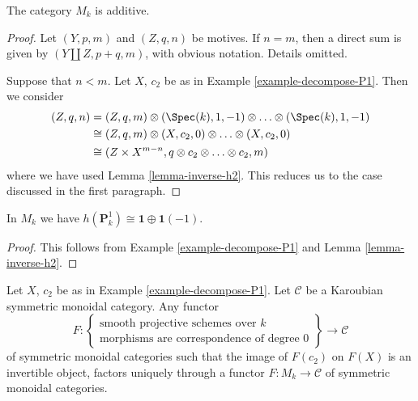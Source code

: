 \begin{lemma}
\label{lemma-additive}
The category $M_k$ is additive.
\end{lemma}

\begin{proof}
Let $(Y, p, m)$ and $(Z, q, n)$ be motives. If $n = m$, then a
direct sum is given by $(Y \amalg Z, p + q, m)$, with obvious notation.
Details omitted.

\medskip\noindent
Suppose that $n < m$. Let $X$, $c_2$ be as in
Example \ref{example-decompose-P1}. Then we consider
\begin{align*}
(Z, q, n)
& =
(Z, q, m) \otimes (\Spec(k), 1, -1) \otimes \ldots \otimes
(\Spec(k), 1, -1) \\
& \cong
(Z, q, m) \otimes (X, c_2, 0) \otimes \ldots \otimes (X, c_2, 0) \\
& \cong
(Z \times X^{m - n}, q \otimes c_2 \otimes \ldots \otimes c_2, m)
\end{align*}
where we have used Lemma \ref{lemma-inverse-h2}.
This reduces us to the case discussed in the first paragraph.
\end{proof}

\begin{lemma}
\label{lemma-decompose-P1}
In $M_k$ we have $h(\mathbf{P}^1_k) \cong \mathbf{1} \oplus \mathbf{1}(-1)$.
\end{lemma}

\begin{proof}
This follows from Example \ref{example-decompose-P1} and
Lemma \ref{lemma-inverse-h2}.
\end{proof}

\begin{lemma}
\label{lemma-characterize-motives}
Let $X$, $c_2$ be as in Example \ref{example-decompose-P1}.
Let $\mathcal{C}$ be a Karoubian symmetric monoidal category.
Any functor
$$
F :
\left\{
\begin{matrix}
\text{smooth projective schemes over }k\\
\text{morphisms are correspondence of degree }0
\end{matrix}
\right\}
\longrightarrow
\mathcal{C}
$$
of symmetric monoidal categories such that the image of $F(c_2)$ on
$F(X)$ is an invertible object, factors uniquely through a functor
$F : M_k \to \mathcal{C}$ of symmetric monoidal categories.
\end{lemma}

